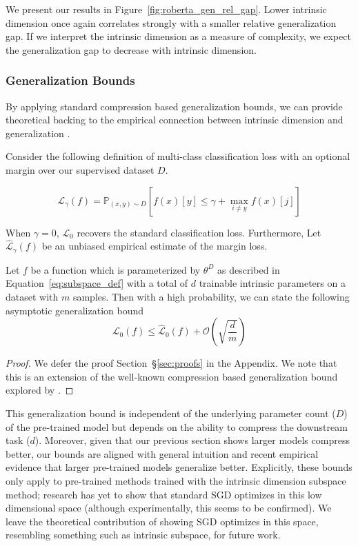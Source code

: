We present our results in Figure~\ref{fig:roberta_gen_rel_gap}. Lower intrinsic dimension once again correlates strongly with a smaller relative generalization gap. If we interpret the intrinsic dimension as a measure of complexity, we expect the generalization gap to decrease with intrinsic dimension.

\subsubsection{Generalization Bounds} By applying standard compression based generalization bounds, we can provide theoretical backing to the empirical connection between intrinsic dimension and generalization \citep{compression_generalization_gap}.

Consider the following definition of multi-class classification loss with an optional margin over our supervised dataset $D$.

\begin{equation}
    \mathcal{L}_{\gamma}(f) = \mathbb{P}_{(x,y)\sim D}\left[f(x)[y] \le \gamma + \max_{i \ne y} f(x)[j] \right]
\end{equation}

When $\gamma = 0$, $\mathcal{L}_0$ recovers the standard classification loss. Furthermore, Let $\hat{\mathcal{L}}_{\gamma}(f)$ be an unbiased empirical estimate of the margin loss.

\begin{theorem}
Let $f$ be a function which is parameterized by $\theta^D$ as described in Equation~\ref{eq:subspace_def} with a total of $d$ trainable intrinsic parameters on a dataset with $m$ samples. Then with a high probability, we can state the following asymptotic generalization bound
\begin{equation}
    \mathcal{L}_{0}(f) \leq \hat{\mathcal{L}}_{0}(f) + \mathcal{O}\left(\sqrt{\frac{d}{m}}\right)
\end{equation}
\end{theorem}

\begin{proof}
We defer the proof Section~\S\ref{sec:proofs} in the Appendix. We note that this is an extension of the well-known compression based generalization bound explored by \cite{compression_generalization_gap}.  
\end{proof}

This generalization bound is independent of the underlying parameter count ($D$) of the pre-trained model but depends on the ability to compress the downstream task ($d$). Moreover, given that our previous section shows larger models compress better, our bounds are aligned with general intuition and recent empirical evidence that larger pre-trained models generalize better. Explicitly, these bounds only apply to pre-trained methods trained with the intrinsic dimension subspace method; research has yet to show that standard SGD optimizes in this low dimensional space (although experimentally, this seems to be confirmed). We leave the theoretical contribution of showing SGD optimizes in this space, resembling something such as intrinsic subspace, for future work.

